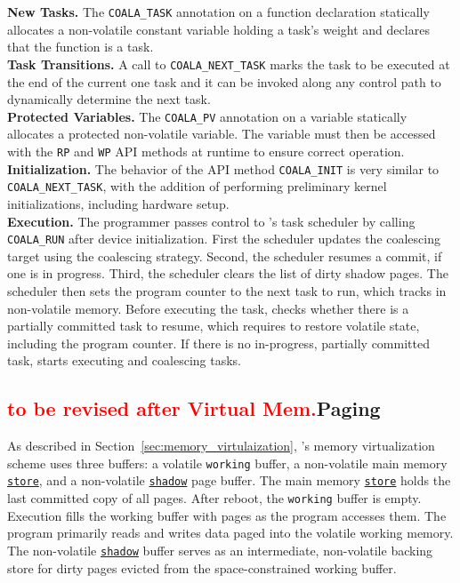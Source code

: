 
\noindent\textbf{New Tasks.} The \texttt{COALA\_TASK} annotation on a function
declaration statically allocates a non-volatile constant variable holding a
task's weight and declares that the function is a task.\\
%
\noindent\textbf{Task Transitions.} A call to \texttt{COALA\_NEXT\_TASK} marks the task to be executed at the 
end of the current one task and it can be invoked along
any control path to dynamically determine the next task.\\
%
\noindent\textbf{Protected Variables.} The \texttt{COALA\_PV} annotation on a
variable statically allocates a protected non-volatile variable. The
variable must then be accessed with the \texttt{RP} and \texttt{WP} API methods at
runtime to ensure correct operation.\\
%
\noindent\textbf{Initialization.} The behavior of the API method
\texttt{COALA\_INIT} is very similar to \texttt{COALA\_NEXT\_TASK}, with the
addition of performing preliminary kernel initializations, including hardware setup.\\
%
\noindent\textbf{Execution.} The programmer passes control to \sys's task scheduler 
by calling \texttt{COALA\_RUN} after device initialization. 
%
First the scheduler updates the coalescing target using the coalescing
strategy.  Second, the scheduler resumes a commit, if one is in progress. Third,
the scheduler clears the list of dirty shadow pages. The scheduler then 
sets the program counter to the next task to run, which \sys tracks in  
non-volatile memory.  
%
Before executing the task, \sys checks whether there is a partially committed
task to resume, which requires \sys to restore volatile state, including the program
counter.  
%
If there is no in-progress, partially committed task, \sys starts executing and
coalescing tasks. 


\subsection{\textcolor{red}{to be revised after Virtual Mem.}Paging}
\label{sec:impl:paging}

As described in Section~\ref{sec:memory_virtulaization}, \sys's memory
virtualization scheme uses three buffers: a volatile \texttt{working} buffer, a
non-volatile main memory \texttt{\underline{store}}, and a non-volatile
\texttt{\underline{shadow}} page buffer. 
%
The main memory \texttt{\underline{store}} holds the last committed copy of all 
pages. 
%
After reboot, the \texttt{working} buffer is empty. Execution fills 
the working buffer with pages as the program accesses them. 
%
The program primarily reads and writes data paged into the volatile working memory. 
%
The non-volatile \texttt{\underline{shadow}} buffer serves as an intermediate,
non-volatile backing store for dirty pages evicted from the space-constrained
working buffer. 

